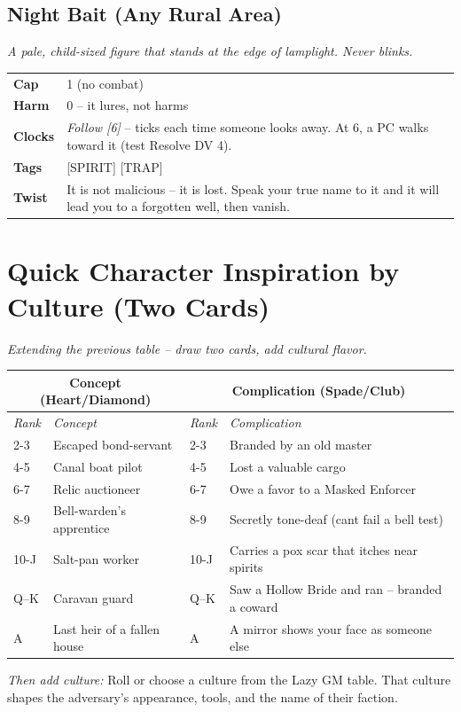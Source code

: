 \documentclass[10pt,twocolumn]{article}
\newcommand{\kw}[1]{\textbf{#1}}     %
\begin{document}
\subsection*{Night Bait (Any Rural Area)}
\textit{A pale, child-sized figure that stands at the edge of lamplight. Never blinks.}
\begin{tabular}{@{}ll}
\toprule
\kw{Cap} & 1 (no combat) \\
\kw{Harm} & 0 -- it lures, not harms \\
\kw{Clocks} & \textit{Follow [6]} -- ticks each time someone looks away. At 6, a PC walks toward it (test Resolve DV 4). \\
\kw{Tags} & [SPIRIT] [TRAP] \\
\kw{Twist} & It is not malicious -- it is lost. Speak your true name to it and it will lead you to a forgotten well, then vanish. \\
\bottomrule
\end{tabular}

\section*{Quick Character Inspiration by Culture (Two Cards)}
\textit{Extending the previous table -- draw two cards, add cultural flavor.}

\vspace{0.1in}
\begin{tabular}{@{}p{}p{}p{}p{}}
\toprule
\multicolumn{2}{c}{\textbf{Concept (Heart/Diamond)}} &
\multicolumn{2}{c}{\textbf{Complication (Spade/Club)}} \\
\midrule
\emph{Rank} & \emph{Concept} & \emph{Rank} & \emph{Complication} \\
2-3 & Escaped bond-servant & 2-3 & Branded by an old master \\
4-5 & Canal boat pilot & 4-5 & Lost a valuable cargo \\
6-7 & Relic auctioneer & 6-7 & Owe a favor to a Masked Enforcer \\
8-9 & Bell-warden's apprentice & 8-9 & Secretly tone-deaf (cant fail a bell test) \\
10-J & Salt-pan worker & 10-J & Carries a pox scar that itches near spirits \\
Q--K & Caravan guard & Q--K & Saw a Hollow Bride and ran -- branded a coward \\
A & Last heir of a fallen house & A & A mirror shows your face as someone else \\
\bottomrule
\end{tabular}

\textit{Then add culture:} Roll or choose a culture from the Lazy GM table. That culture shapes the adversary's appearance, tools, and the name of their faction.
\end{document}
